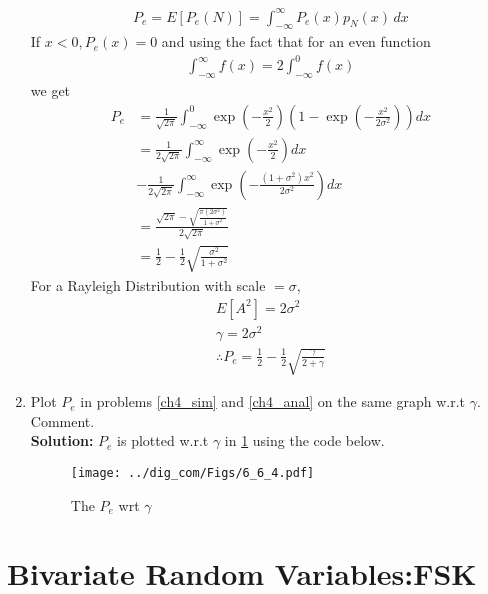 \documentclass{article}
\numberwithin{equation}{subsection}
\numberwithin{figure}{subsection}
\providecommand{\brak}[1]{\ensuremath{\left(#1\right)}}
\providecommand{\sbrak}[1]{\ensuremath{{}\left[#1\right]}}
\newcommand{\solution}{\noindent \textbf{Solution: }}
\renewcommand\thesection{\arabic{section}}
\renewcommand\thesubsection{\thesection.\arabic{subsection}}
\begin{document}
\begin{enumerate}[label=\thesubsection.\arabic*,ref=\thesubsection.\arabic{figure}]
\begin{align}
 P_e=E\sbrak{P_e(N)} = \int_{-\infty}^{\infty}P_e(x)p_{N}(x)\, dx  
\end{align}
If $x<0, P_e(x)=0$ and using the fact that for an even function
\begin{align}
\int_{-\infty}^{\infty}f(x)=2\int_{-\infty}^{0}f(x)   
\end{align}
we get
\begin{align}
  P_e&= \frac{1}{\sqrt{2\pi}}\int_{-\infty}^{0}\exp \brak{ -\frac{x^2}{2}} \brak{1-\exp \brak{ -\frac{x^2}{2\sigma^2}} } dx\\
&= \frac{1}{2\sqrt{2\pi}} \int_{-\infty}^{\infty} \exp \brak{ -\frac{x^2}{2} }dx \nonumber \\
&- \frac{1}{2\sqrt{2\pi}} \int_{-\infty}^{\infty} \exp \brak{-\frac{(1+ \sigma^2)x^2}{2 \sigma^2}}  dx\\
&= \frac{\sqrt{2\pi} - \sqrt{\frac{\pi(2\sigma^2)}{1+\sigma^2}}}{2\sqrt{2\pi}}\\
&= \frac{1}{2} - \frac{1}{2}\sqrt{\frac{\sigma^2}{1+\sigma^2}}
\end{align}
For a Rayleigh Distribution with scale $= \sigma$,
\begin{align}
E\sbrak{A^2} = 2\sigma^2\\
\gamma = 2\sigma^2\\
\therefore P_e = \frac{1}{2} - \frac{1}{2}\sqrt{\frac{\gamma}{2+\gamma}}
\end{align}
\item
Plot $P_e$ in problems \ref{ch4_sim} and \ref{ch4_anal} on the same graph w.r.t $\gamma$.  Comment. \\
\solution $P_e$ is plotted w.r.t $\gamma$ in \ref{fig:Pe_gamma1} using the code below.
\begin{center}
\end{center}
\begin{figure}
\centering
\texttt{[image: ../dig\_com/Figs/6\_6\_4.pdf]}      
\caption{The $P_e$ wrt $\gamma$ }
\label{fig:Pe_gamma1}
\end{figure}
\end{enumerate}
\section{Bivariate Random Variables:FSK}
\end{document}

